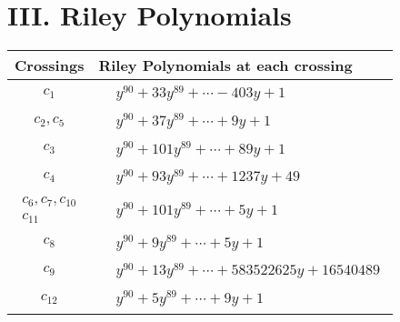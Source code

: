 \documentclass[1p]{elsarticle_modified}
\theoremstyle{definition}
\begin{document}
\centering \section*{ III. Riley Polynomials}
\begin{tabular}{m{50pt}|m{274pt}}
Crossings & \hspace{64pt}Riley Polynomials at each crossing \\
\hline $$\begin{aligned}c_{1}\end{aligned}$$&$\begin{aligned}
&y^{90}+33 y^{89}+\cdots-403 y+1
\end{aligned}$\\
\hline $$\begin{aligned}c_{2},c_{5}\end{aligned}$$&$\begin{aligned}
&y^{90}+37 y^{89}+\cdots+9 y+1
\end{aligned}$\\
\hline $$\begin{aligned}c_{3}\end{aligned}$$&$\begin{aligned}
&y^{90}+101 y^{89}+\cdots+89 y+1
\end{aligned}$\\
\hline $$\begin{aligned}c_{4}\end{aligned}$$&$\begin{aligned}
&y^{90}+93 y^{89}+\cdots+1237 y+49
\end{aligned}$\\
\hline $$\begin{aligned}c_{6},c_{7},c_{10}\\c_{11}\end{aligned}$$&$\begin{aligned}
&y^{90}+101 y^{89}+\cdots+5 y+1
\end{aligned}$\\
\hline $$\begin{aligned}c_{8}\end{aligned}$$&$\begin{aligned}
&y^{90}+9 y^{89}+\cdots+5 y+1
\end{aligned}$\\
\hline $$\begin{aligned}c_{9}\end{aligned}$$&$\begin{aligned}
&y^{90}+13 y^{89}+\cdots+583522625 y+16540489
\end{aligned}$\\
\hline $$\begin{aligned}c_{12}\end{aligned}$$&$\begin{aligned}
&y^{90}+5 y^{89}+\cdots+9 y+1
\end{aligned}$\\
\hline
\end{tabular}
\vskip 2pc
\end{document}
